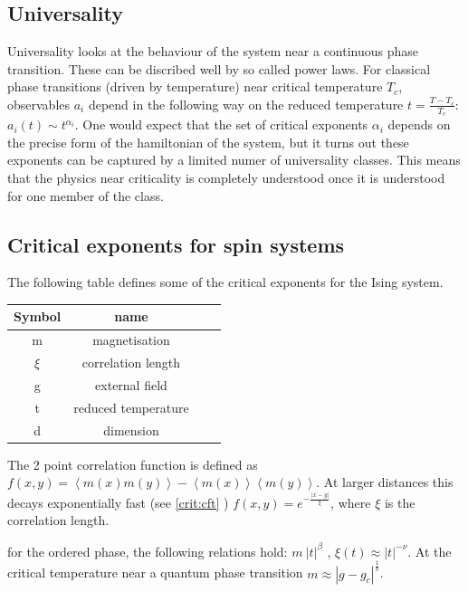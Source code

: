 \subsection{Universality}

Universality looks at the behaviour of the system near a continuous phase transition. These can be discribed well by so called power laws. For classical phase transitions (driven by temperature) near critical temperature $T_c$, observables $a_i$ depend in the following way on the reduced temperature $t=\frac{T-T_c}{T_c}$: $ a_i(t) \sim t^{\alpha_i}$. One would expect that the set of critical exponents ${\alpha_i}$ depends on the precise form of the hamiltonian of the system, but it turns out these exponents can be captured by a limited numer of universality classes. This means that the physics near criticality is completely understood once it is understood for one member of the class.

\subsection{Critical exponents for spin systems}
The following table defines some of the critical exponents for the Ising system.

\begin{table}[h!]
    \centering
    \begin{tabular}{c c c c}
        Symbol & name                \\
        \hline
        m      & magnetisation       \\
        $\xi$  & correlation length  \\
        g      & external field      \\
        t      & reduced temperature \\
        d      & dimension           \\
    \end{tabular}
\end{table}

The 2 point correlation function is defined as $ f( x,y) =  \left < m(x) m(y) \right > -  \left<m(x) \right> \left<m(y) \right> $. At larger distances this decays exponentially fast (see \cref{crit:cft} ) $ f(  x,y ) = e^{ -\frac{ |x-y|}{ \xi} } $, where $\xi$ is the correlation length.

for the ordered phase, the following relations hold: $m ~ |t|^{\beta} $ , $\xi(t) \approx |t|^{-\nu} $. At the critical temperature near a quantum phase transition  $ m \approx |g-g_c|^{\frac{1}{\delta}} $.

